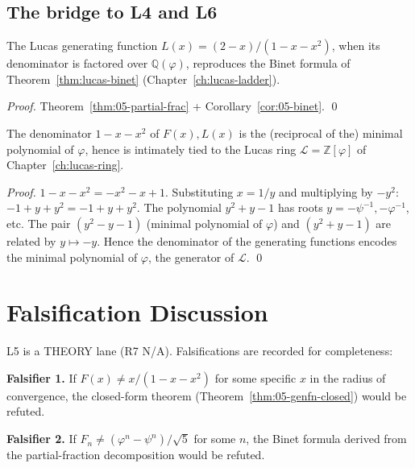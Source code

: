 \subsection{The bridge to L4 and L6}

\begin{theorem}
\label{fa_05:thm:05-bridge-to-l4}
The Lucas generating function $L(x) = (2-x)/(1-x-x^2)$, when its
denominator is factored over $\mathbb{Q}(\varphi)$, reproduces the
Binet formula of Theorem~\ref{thm:lucas-binet} (Chapter~\ref{ch:lucas-ladder}).
\end{theorem}

\begin{proof}
Theorem~\ref{thm:05-partial-frac} + Corollary~\ref{cor:05-binet}. \qed
\end{proof}

\begin{theorem}
\label{fa_05:thm:05-bridge-to-l6}
The denominator $1 - x - x^2$ of $F(x), L(x)$ is the (reciprocal of the)
minimal polynomial of $\varphi$, hence is intimately tied to the Lucas
ring $\mathcal{L} = \mathbb{Z}[\varphi]$ of Chapter~\ref{ch:lucas-ring}.
\end{theorem}

\begin{proof}
$1 - x - x^2 = -x^2 - x + 1$. Substituting $x = 1/y$ and multiplying by
$-y^2$: $-1 + y + y^2 = -1 + y + y^2$. The polynomial $y^2 + y - 1$ has
roots $y = -\psi^{-1}, -\varphi^{-1}$, etc. The pair $(y^2 - y - 1)$
(minimal polynomial of $\varphi$) and $(y^2 + y - 1)$ are related by
$y \mapsto -y$. Hence the denominator of the generating functions
encodes the minimal polynomial of $\varphi$, the generator of
$\mathcal{L}$. \qed
\end{proof}

\section{Falsification Discussion}
\label{sec:05-falsification}

L5 is a THEORY lane (R7 N/A). Falsifications are recorded for
completeness:

\textbf{Falsifier 1.} If $F(x) \ne x/(1-x-x^2)$ for some specific $x$
in the radius of convergence, the closed-form theorem
(Theorem~\ref{thm:05-genfn-closed}) would be refuted.

\textbf{Falsifier 2.} If $F_n \ne (\varphi^n - \psi^n)/\sqrt{5}$ for some
$n$, the Binet formula derived from the partial-fraction decomposition
would be refuted.

